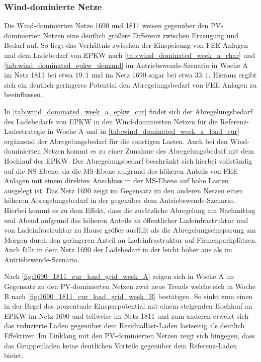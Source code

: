 \subsubsection{Wind-dominierte Netze}

Die Wind-dominierten Netze \num{1690} und \num{1811} weisen gegenüber den \gls{PV}-dominierten Netzen eine deutlich größere Differenz zwischen Erzeugung und Bedarf auf.
So liegt das Verhältnis zwischen der Einspeisung von \gls{FEE} Anlagen und dem Ladebedarf von \gls{EPKW} nach \autoref{tab:wind_dominated_week_a_char} und \autoref{tab:wind_dominated_epkw_demand} im Antriebswende-Szenario in Woche A im Netz \num{1811} bei etwa \(19:1\) und im Netz \num{1690} sogar bei etwa \(33:1\).
Hieraus ergibt sich ein deutlich geringeres Potential den Abregelungsbedarf von \gls{FEE} Anlagen zu beeinflussen.






In \autoref{tab:wind_dominated_week_a_epkw_cur} findet sich der Abregelungsbedarf des Ladebedarfs von \gls{EPKW} in den Wind-dominierten Netzen für die Referenz-Ladestrategie in Woche A und in \autoref{tab:wind_dominated_week_a_load_cur} ergänzend der Abregelungsbedarf für die sonstigen Lasten.
Auch bei den Wind-dominierten Netzen kommt es zu einer Zunahme des Abregelungsbedarf mit dem Hochlauf der \gls{EPKW}.
Der Abregelungsbedarf beschränkt sich hierbei vollständig auf die \gls{NS}-Ebene, da die \gls{MS}-Ebene aufgrund des höheren Anteils von \gls{FEE} Anlagen mit einem direkten Anschluss in der \gls{MS}-Ebene auf hohe Lasten ausgelegt ist.
Das Netz \num{1690} zeigt im Gegensatz zu den anderen Netzen einen höheren Abregelungsbedarf in der \SzeFirmenparkplatz gegenüber dem Antriebswende-Szenario.
Hierbei kommt es zu dem Effekt, dass die zusätzliche Abregelung am Nachmittag und Abend aufgrund des höheren Anteils an öffentlicher Ladeinfrastruktur und von Ladeinfrastruktur zu Hause größer ausfällt als die Abregelungseinsparung am Morgen durch den geringeren Anteil an Ladeinfrastruktur auf Firmenparkplätzen.
Auch fällt in dem Netz \num{1690} der Ladebedarf in der \SzeFirmenparkplatz leicht höher aus als im Antriebswende-Szenario.





Nach \autoref{fig:1690_1811_cur_load_grid_week_A} zeigen sich in Woche A im Gegensatz zu den \gls{PV}-dominierten Netzen zwei neue Trends welche sich in Woche B nach \autoref{fig:1690_1811_cur_load_grid_week_B} bestätigen.
So sinkt zum einen in der Regel das prozentuale Einsparpotential mit einem steigenden Hochlauf an \gls{EPKW} im Netz \num{1690} und teilweise im Netz \num{1811} und zum anderen erweist sich das reduzierte Laden gegenüber dem Residuallast-Laden lastseitig als deutlich Effektiver.
Im Einklang mit den \gls{PV}-dominierten Netzen zeigt sich hingegen, dass das Gruppenladen keine deutlichen Vorteile gegenüber dem Referenz-Laden bietet.

